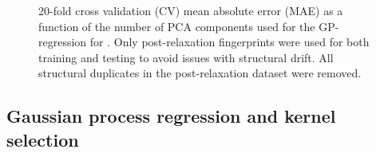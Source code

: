 

\begin{figure}[!htb]
\centering
{}
\caption{\label{fig:cv_anal}
20-fold cross validation (CV) mean absolute error (MAE) as a function of the number of PCA components used for the GP-regression for \IrOthree.
%
Only post-relaxation fingerprints were used for both training and testing to avoid issues with structural drift.
%
All structural duplicates in the post-relaxation dataset were removed.
}
\end{figure}


\subsection{Gaussian process regression and kernel selection}
%

